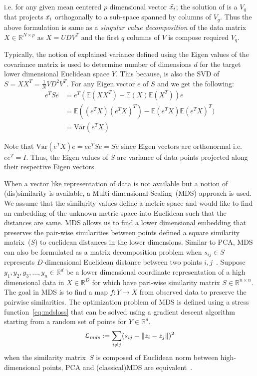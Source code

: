 i.e. for any given mean centered \(p\) dimensional vector \(\Tilde{x_i}\); the solution of  is a \(V_q\) that projects \(\Tilde{x_i}\) orthogonally to a sub-space spanned by columns of \(V_q\).
Thus the above formulation is same as a \textit{singular value decomposition} of the data matrix \(X\in \mathbb{R}^{N\times p}\) as \(X = UDV^T\) and the first \(q\) columns of \(V\) is compose required \(V_q\). 

Typically, the notion of explained variance defined using the Eigen values of the covariance matrix is used to determine number of dimensions \(d\) for the target lower dimensional Euclidean space \(Y\).
This because,  is also the SVD of \(S = XX^{T} = \frac{1}{N}VD^2V^T\).
For any Eigen vector \(e\) of \(S\) and we get the following:
\begin{align}
    e^TSe &= e^T (\mathbb{E}(XX^T)-\mathbb{E}(X)\mathbb{E}(X^T))e \nonumber \\
    &= \mathbb{E}((e^TX)(e^TX)^T)-\mathbb{E}(e^TX)\mathbb{E}(e^TX)^T) \nonumber \\
    &= \text{Var}(e^TX)
\end{align}

Note that \(\text{Var}(e^TX)e = ee^TSe = Se\) since Eigen vectors are orthonormal i.e. \(ee^T=I\).
Thus, the Eigen values of \(S\) are variance of data points projected along their respective Eigen vectors. 


When a vector like representation of data is not available but a notion of (dis)similarity is available, a Multi-dimensional Scaling~(MDS) approach is used. 
We assume that the similarity values define a metric space and would like to find an embedding of the unknown metric space into Euclidean such that the distances are same.
MDS allows us to find a lower dimensional embedding that preserves the pair-wise similarities between points defined a square similarity matrix~(\(S\)) to euclidean distances in the lower dimensions. 
Similar to PCA, MDS can also be formulated as a matrix decomposition problem when \(s_{ij}\in S\) represents \(D\)-dimensional Euclidean distance between two points \(i,j\)~\cite{ESL}. 
Suppose \(y_1,y_2,y_3,\dots,y_n \in \mathbb{R}^d\) be a lower dimensional coordinate representation of a high dimensional data in \(X\in \mathbb{R}^D\) for which have pari-wise similarity matrix \(S \in \mathbb{R}^{n \times n}\). 
The goal in MDS is to find a map \(f: Y \rightarrow X\) from observed data to preserve the pairwise similarities. The optimization problem of MDS is defined using a stress function~\cref{eq:mdsloss} that can be solved using a gradient descent algorithm starting from a random set of points for \(Y\in\mathbb{R}^d\).
\begin{align}\label{eq:mdsloss}
    \mathcal{L}_{mds}:= \sum_{i\neq j}(s_{ij} - \left\lVert z_i - z_j\right\rVert)^2
\end{align}
when the similarity matrix~\(S\) is composed of Euclidean norm between high-dimensional points, PCA and (classical)MDS are equivalent~\cite{ESL}.

